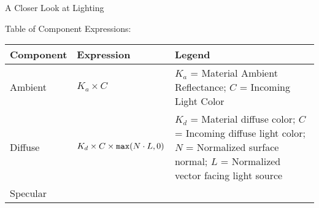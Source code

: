\documentclass[11pt]{article}
\begin{document}
\begin{topic}{A Closer Look at Lighting}
	\item Table of Component Expressions: \\
	\begin{tabular}{llp{3in}}
		\textbf{Component} & \textbf{Expression} & \textbf{Legend} \\ \hline
		Ambient & $K_a \times C$ & $K_a$ = Material Ambient Reflectance; $C$ = Incoming Light Color \\
		Diffuse & $K_d \times C \times \code{max}(N \cdot L, 0)$ & $K_d$ = Material diffuse color; $C$ = Incoming diffuse light color; $N$ = Normalized surface normal; $L$ = Normalized vector facing light source \\
		Specular & $$ & \\
	\end{tabular}
\end{topic}
\end{document}
